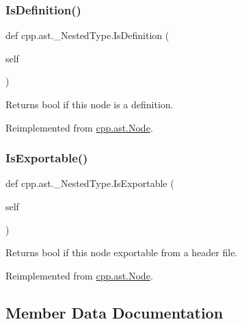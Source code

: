 \mbox{\label{classcpp_1_1ast_1_1___nested_type_a9f160999863f39c9032f60b014e213d5}} 
\subsubsection{\texorpdfstring{IsDefinition()}{IsDefinition()}}
{\footnotesize\ttfamily def cpp.\+ast.\+\_\+\+Nested\+Type.\+Is\+Definition (\begin{DoxyParamCaption}\item[{}]{self }\end{DoxyParamCaption})}

\begin{DoxyVerb}Returns bool if this node is a definition.\end{DoxyVerb}
 

Reimplemented from \mbox{\hyperlink{classcpp_1_1ast_1_1_node_a684ee9a357168e7e07a24fc6812f66e6}{cpp.\+ast.\+Node}}.

\mbox{\label{classcpp_1_1ast_1_1___nested_type_a689f8b0dc20e6070938825eee483dd2f}} 
\subsubsection{\texorpdfstring{IsExportable()}{IsExportable()}}
{\footnotesize\ttfamily def cpp.\+ast.\+\_\+\+Nested\+Type.\+Is\+Exportable (\begin{DoxyParamCaption}\item[{}]{self }\end{DoxyParamCaption})}

\begin{DoxyVerb}Returns bool if this node exportable from a header file.\end{DoxyVerb}
 

Reimplemented from \mbox{\hyperlink{classcpp_1_1ast_1_1_node_a313273874ccf578485006d4000128234}{cpp.\+ast.\+Node}}.



\subsection{Member Data Documentation}
\mbox{\label{classcpp_1_1ast_1_1___nested_type_aed69c37a409b4d26e6cfde2de3185d86}} 

